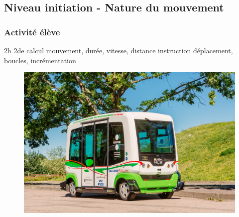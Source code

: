 \subsection{Niveau initiation - Nature du mouvement}

\subsubsection{Activité élève}

\cartouche
{2h}         %
{2de}         %
{calcul}        %
{mouvement, durée, vitesse, distance}     %
{instruction déplacement, boucles, incrémentation}       %


\begin{figure}
    \includegraphics[width=\linewidth]{res/mbot_autonome.jpg}
\end{figure}

